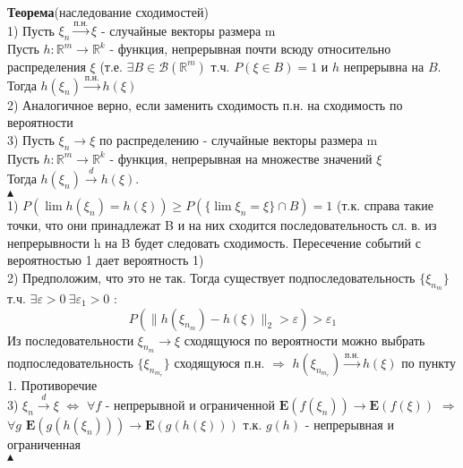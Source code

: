 \documentclass[25pt]{article}
\begin{document}
\textbf{Теорема}(наследование сходимостей) \\
1) Пусть $\xi_n \xrightarrow{\text{п.н.}} \xi$  - случайные векторы размера m\\
Пусть $h : \mathbb{R}^m \rightarrow \mathbb{R}^k$ - функция, непрерывная почти всюду относительно
распределения $\xi$ (т.е. $\exists B \in \mathcal{B}(\mathbb{R}^m)$ т.ч. $P(\xi \in B) = 1$ и $h$ непрерывна на $B$.\\
Тогда $h(\xi_n) \xrightarrow{\text{п.н.}} h(\xi)$
\\
2) Аналогичное верно, если заменить сходимость п.н. на сходимость по вероятности\\
3) Пусть $\xi_n \rightarrow \xi$ по распределению - случайные векторы размера m\\
Пусть $h : \mathbb{R}^m \rightarrow \mathbb{R}^k$ - функция, непрерывная на множестве значений $\xi$\\
Тогда $h(\xi_n) \xrightarrow{d} h(\xi)$.
\\
$\blacktriangle$
\\
1) $P(\lim h(\xi_n) = h(\xi)) \geq P(\{\lim\xi_n = \xi\} \cap B) = 1$ (т.к. справа такие точки, что они принадлежат B и на них сходится последовательность сл. в. из непрерывности h на B будет следовать сходимость. Пересечение событий с вероятностью 1 дает вероятность 1)\\
2) Предположим, что это не так. Тогда существует подпоследовательность $\{\xi_{n_m}\}$ т.ч. $\exists \varepsilon > 0 \ \exists \varepsilon_1 > 0$ :
$$ P(\|h(\xi_{n_m}) - h(\xi)\|_2 > \varepsilon) > \varepsilon_1 $$
Из последовательности $\xi_{n_m} \rightarrow \xi$ сходящуюся по вероятности можно выбрать подпоследовательность $\{ \xi_{n_{m_r}}\}$ сходящуюся п.н. $\Rightarrow$ $h(\xi_{n_{m_r}}) \xrightarrow{\text{п.н.}} h(\xi)$ по пункту 1. Противоречие
\\
3) $\xi_n \xrightarrow{d} \xi$ $\Leftrightarrow$ $\forall f$ - непрерывной и ограниченной $\mathbf{E}(f(\xi_n)) \rightarrow \mathbf{E}(f(\xi))$ $\Rightarrow$ $\forall g$ $\mathbf{E}(g(h(\xi_n))) \rightarrow \mathbf{E}(g(h(\xi)))$ т.к. $g(h)$ - непрерывная и ограниченная\\
$\blacktriangle$\\ \\
\end{document}
